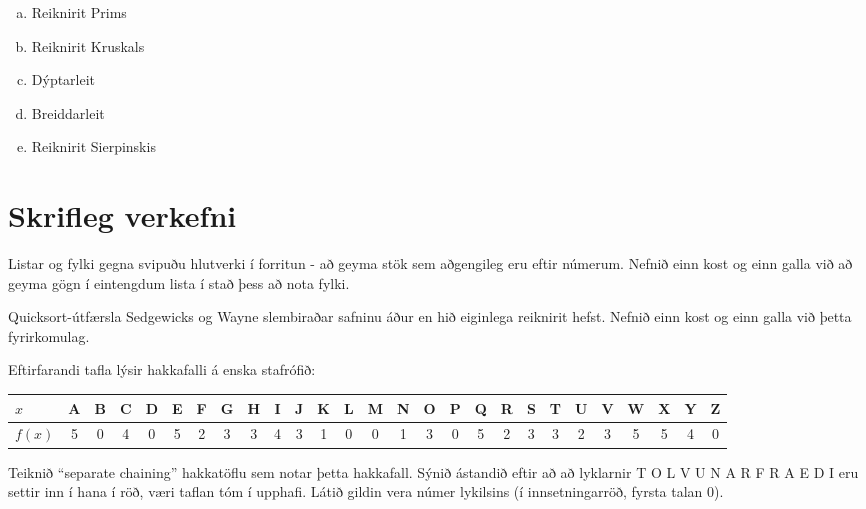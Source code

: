 \documentclass[addpoints]{exam}
\begin{document}
\begin{questions}
	\begin{enumerate}[a)]
		\item Reiknirit Prims
		\item Reiknirit Kruskals
		\item Dýptarleit
		\item Breiddarleit
		\item Reiknirit Sierpinskis
	\end{enumerate}

	\section{Skrifleg verkefni}

	\question[5]
	Listar og fylki gegna svipuðu hlutverki í forritun - að geyma stök sem aðgengileg eru eftir númerum. Nefnið einn kost og einn galla við að geyma gögn í eintengdum lista í stað þess að nota fylki.


	\question[5]
	Quicksort-útfærsla Sedgewicks og Wayne slembiraðar safninu áður en hið eiginlega reiknirit hefst. Nefnið einn kost og einn galla við þetta fyrirkomulag.


	\newpage

	\question[5]

	Eftirfarandi tafla lýsir hakkafalli á enska stafrófið:

	\begin{center}
		\scriptsize
		\begin{tabular}{l*{26}{c}}
			\toprule
			$x$    & A & B & C & D & E & F & G & H & I & J & K & L & M & N & O & P & Q & R & S & T & U & V & W & X & Y & Z \\
			\midrule
			$f(x)$ & 5 & 0 & 4 & 0 & 5 & 2 & 3 & 3 & 4 & 3 & 1 & 0 & 0 & 1 & 3 & 0 & 5 & 2 & 3 & 3 & 2 & 3 & 5 & 5 & 4 & 0 \\
			\bottomrule
		\end{tabular}
	\end{center}

	Teiknið ``separate chaining'' hakkatöflu sem notar þetta hakkafall. Sýnið ástandið eftir að að lyklarnir T O L V U N A R F R A E D I eru settir inn í hana í röð, væri taflan tóm í upphafi. Látið gildin vera númer lykilsins (í innsetningarröð, fyrsta talan 0).





\end{questions}
\end{document}
